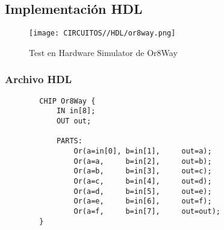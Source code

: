 \documentclass[12pt]{article}
\begin{document}
    \subsection{Implementación HDL}
        \begin{figure}[H]
            \centering
            \texttt{[image: CIRCUITOS//HDL/or8way.png]}
            \caption{Test en Hardware Simulator de Or8Way \cite{nand2tetris}}
            \label{fig:hdlor8way}
        \end{figure}
        \subsubsection{Archivo HDL}
            \begin{lstlisting}
        CHIP Or8Way {
            IN in[8];
            OUT out;
        
            PARTS:
                Or(a=in[0], b=in[1],     out=a);
                Or(a=a,     b=in[2],     out=b);
                Or(a=b,     b=in[3],     out=c);
                Or(a=c,     b=in[4],     out=d);
                Or(a=d,     b=in[5],     out=e);
                Or(a=e,     b=in[6],     out=f);
                Or(a=f,     b=in[7],     out=out);
        }
            \end{lstlisting}
    \newpage
\newpage

\printbibliography[heading=bibintoc]
\end{document}
